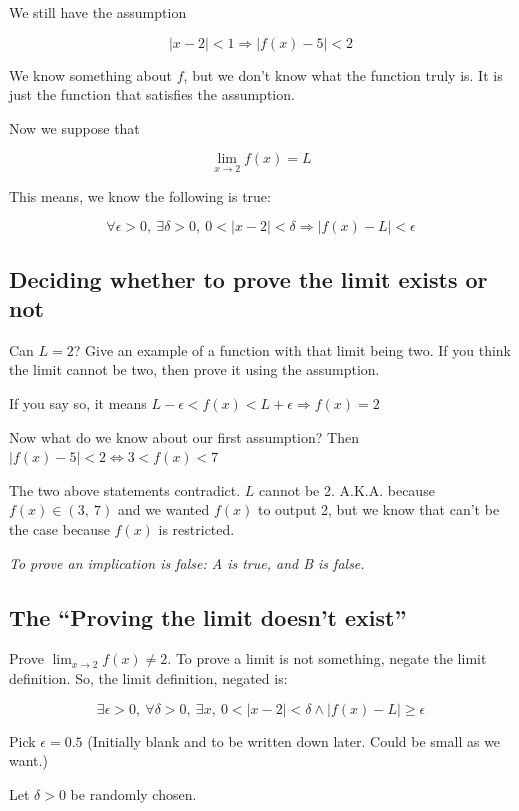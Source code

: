 \documentclass[
]{article}
\newcounter{example}
\begin{document}
We still have the assumption

$$|x - 2| < 1 \Rightarrow \left| f(x) - 5 \right| < 2$$

We know something about $f$, but we don't know what the function truly
is. It is just the function that satisfies the assumption.

Now we suppose that

$$\lim_{x \rightarrow 2}{f(x) = L}$$

This means, we know the following is true:

$$\forall\epsilon > 0,\ \exists\delta > 0,\ 0 < |x - 2| < \delta \Rightarrow \left| f(x) - L \right| < \epsilon$$


\subsection{Deciding whether to prove the limit exists or
not}

Can $L = 2$? Give an example of a function with that limit being two.
If you think the limit cannot be two, then prove it using the
assumption.

If you say so, it means
$L - \epsilon < f(x) < L + \epsilon \Rightarrow f(x) = 2$

Now what do we know about our first assumption? Then
$\left| f(x) - 5 \right| < 2 \Leftrightarrow 3 < f(x) < 7$

The two above statements contradict. $L$ cannot be 2. A.K.A. because
$f(x) \in (3,\ 7)$ and we wanted $f(x)$ to output 2, but we know
that can't be the case because $f(x)$ is restricted.

\emph{To prove an implication is false: A is true, and B is false.}


\subsection{The ``Proving the limit doesn't
exist''}

Prove $\lim_{x \rightarrow 2}{f(x)} \neq 2$. To prove a limit is not
something, negate the limit definition. So, the limit definition,
negated is:

$$\exists\epsilon > 0,\ \forall\delta > 0,\ \exists x,\ 0 < |x - 2| < \delta \land \left| f(x) - L \right| \geq \epsilon$$

Pick $\epsilon = 0.5$ (Initially blank and to be written down later.
Could be small as we want.)

Let $\delta > 0$ be randomly chosen.
\end{document}
